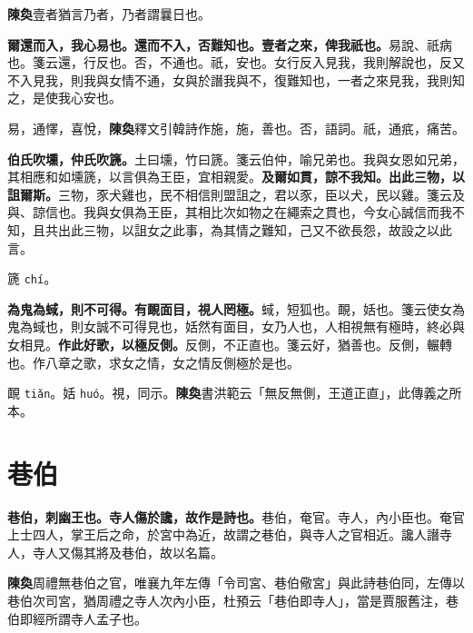 \begin{quoting}\textbf{陳奐}壹者猶言乃者，乃者謂曩日也。\end{quoting}

\textbf{爾還而入，我心易也。還而不入，否難知也。壹者之來，俾我祇也。}{\footnotesize 易說、祇病也。箋云還，行反也。否，不通也。祇，安也。女行反入見我，我則解說也，反又不入見我，則我與女情不通，女與於譖我與不，復難知也，一者之來見我，我則知之，是使我心安也。}

\begin{quoting}易，通懌，喜悅，\textbf{陳奐}釋文引韓詩作施，施，善也。否，語詞。祇，通疧，痛苦。\end{quoting}

\textbf{伯氏吹壎，仲氏吹篪。}{\footnotesize 土曰壎，竹曰篪。箋云伯仲，喻兄弟也。我與女恩如兄弟，其相應和如壎篪，以言俱為王臣，宜相親愛。}\textbf{及爾如貫，諒不我知。出此三物，以詛爾斯。}{\footnotesize 三物，豕犬雞也，民不相信則盟詛之，君以豕，臣以犬，民以雞。箋云及與、諒信也。我與女俱為王臣，其相比次如物之在繩索之貫也，今女心誠信而我不知，且共出此三物，以詛女之此事，為其情之難知，己又不欲長怨，故設之以此言。}

\begin{quoting}篪 \texttt{chí}。\end{quoting}

\textbf{為鬼為蜮，則不可得。有靦面目，視人罔極。}{\footnotesize 蜮，短狐也。靦，姡也。箋云使女為鬼為蜮也，則女誠不可得見也，姡然有面目，女乃人也，人相視無有極時，終必與女相見。}\textbf{作此好歌，以極反側。}{\footnotesize 反側，不正直也。箋云好，猶善也。反側，輾轉也。作八章之歌，求女之情，女之情反側極於是也。}

\begin{quoting}靦 \texttt{tiǎn}。姡 \texttt{huó}。視，同示。\textbf{陳奐}書洪範云「無反無側，王道正直」，此傳義之所本。\end{quoting}

\section{巷伯}


\textbf{巷伯，刺幽王也。寺人傷於讒，故作是詩也。}{\footnotesize 巷伯，奄官。寺人，內小臣也。奄官上士四人，掌王后之命，於宮中為近，故謂之巷伯，與寺人之官相近。讒人譖寺人，寺人又傷其將及巷伯，故以名篇。}

\begin{quoting}\textbf{陳奐}周禮無巷伯之官，唯襄九年左傳「令司宮、巷伯儆宮」與此詩巷伯同，左傳以巷伯次司宮，猶周禮之寺人次內小臣，杜預云「巷伯即寺人」，當是賈服舊注，巷伯即經所謂寺人孟子也。\end{quoting}

